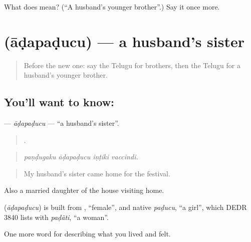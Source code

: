\begin{tcolorbox}[breakable,colback=teal!4,colframe=teal!35!black,title={Before you move on}]
What does  mean? (\textquotedblleft{}A husband's younger brother\textquotedblright{}.) Say it once more.
\end{tcolorbox}
\section[\texorpdfstring{\te{ఆడపడుచు} (āḍapaḍucu)}{ఆడపడుచు (āḍapaḍucu)}]{ (āḍapaḍucu) — a husband's sister}

\label{lesson:TE-C528-adapaducu}



\begin{quote}
Before the new one: say the Telugu for brothers, then the Telugu for a husband's younger brother.
\end{quote}

\subsection*{You'll want to know: }
\textbf{} — \emph{āḍapaḍucu} — \textquotedblleft{}a husband's sister\textquotedblright{}.

\begin{quote}
   .
\end{quote}

\begin{quote}
\emph{paṇḍugaku āḍapaḍucu iṇṭiki vaccindi.}
\end{quote}

\begin{quote}
My husband's sister came home for the festival.
\end{quote}

Also a married daughter of the house visiting home.

\begin{cousinweb}
\textbf{} (\emph{āḍapaḍucu}) is built from , \textquotedblleft{}female\textquotedblright{}, and native \emph{paḍucu}, \textquotedblleft{}a girl\textquotedblright{}, which DEDR 3840 lists with \emph{paḍãti}, \textquotedblleft{}a woman\textquotedblright{}.
\end{cousinweb}

\begin{grammarlens}[title={What you've built}]
One more word for describing what you lived and felt.
\end{grammarlens}


